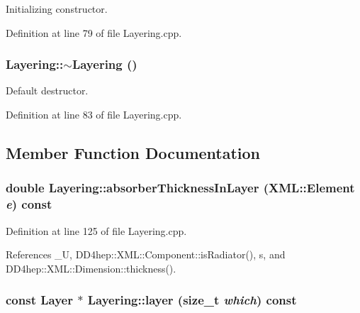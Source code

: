 Initializing constructor. 

Definition at line 79 of file Layering.cpp.\hypertarget{class_d_d4hep_1_1_layering_a4b562fdcbadab7a0bb09121c53949335}{
\subsubsection[{$\sim$Layering}]{\setlength{\rightskip}{0pt plus 5cm}Layering::$\sim$Layering ()}}
\label{class_d_d4hep_1_1_layering_a4b562fdcbadab7a0bb09121c53949335}


Default destructor. 

Definition at line 83 of file Layering.cpp.

\subsection{Member Function Documentation}
\hypertarget{class_d_d4hep_1_1_layering_a1c68ff25462a99628e02118a0647b9e7}{
\subsubsection[{absorberThicknessInLayer}]{\setlength{\rightskip}{0pt plus 5cm}double Layering::absorberThicknessInLayer ({\bf XML::Element} {\em e}) const}}
\label{class_d_d4hep_1_1_layering_a1c68ff25462a99628e02118a0647b9e7}


Definition at line 125 of file Layering.cpp.

References \_\-U, DD4hep::XML::Component::isRadiator(), s, and DD4hep::XML::Dimension::thickness().\hypertarget{class_d_d4hep_1_1_layering_acf360b377854308441871459f88552d4}{
\subsubsection[{layer}]{\setlength{\rightskip}{0pt plus 5cm}const {\bf Layer} $\ast$ Layering::layer (size\_\-t {\em which}) const}}
\label{class_d_d4hep_1_1_layering_acf360b377854308441871459f88552d4}


